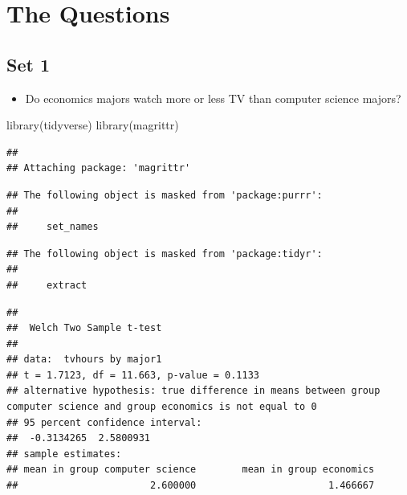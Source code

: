 \documentclass[
]{book}
\newenvironment{Shaded}{\begin{snugshade}}{\end{snugshade}}
\newcommand{\FunctionTok}[1]{\textcolor[rgb]{0.00,0.00,0.00}{#1}}
\newcommand{\NormalTok}[1]{#1}
\newcommand{\SpecialCharTok}[1]{\textcolor[rgb]{0.00,0.00,0.00}{#1}}
\newcommand{\StringTok}[1]{\textcolor[rgb]{0.31,0.60,0.02}{#1}}
\providecommand{\tightlist}{%
  \setlength{\itemsep}{0pt}\setlength{\parskip}{0pt}}
\theoremstyle{definition}
\theoremstyle{definition}
\theoremstyle{definition}
\theoremstyle{definition}
\theoremstyle{remark}
\begin{document}
\hypertarget{the-questions}{%
\section{The Questions}\label{the-questions}}

\hypertarget{set-1}{%
\subsection{Set 1}\label{set-1}}

\begin{itemize}
\tightlist
\item
  Do economics majors watch more or less TV than computer science majors?
\end{itemize}

\begin{Shaded}
\begin{Highlighting}[]
\FunctionTok{library}\NormalTok{(tidyverse)}
\FunctionTok{library}\NormalTok{(magrittr)}
\end{Highlighting}
\end{Shaded}

\begin{verbatim}
## 
## Attaching package: 'magrittr'
\end{verbatim}

\begin{verbatim}
## The following object is masked from 'package:purrr':
## 
##     set_names
\end{verbatim}

\begin{verbatim}
## The following object is masked from 'package:tidyr':
## 
##     extract
\end{verbatim}

\begin{Shaded}
\end{Shaded}

\begin{verbatim}
## 
##  Welch Two Sample t-test
## 
## data:  tvhours by major1
## t = 1.7123, df = 11.663, p-value = 0.1133
## alternative hypothesis: true difference in means between group computer science and group economics is not equal to 0
## 95 percent confidence interval:
##  -0.3134265  2.5800931
## sample estimates:
## mean in group computer science        mean in group economics 
##                       2.600000                       1.466667
\end{verbatim}
\end{document}

